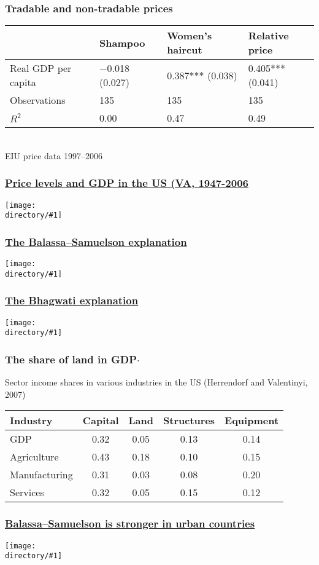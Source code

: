 \documentclass[compress,mathserif]{beamer}
\newcounter{perc}
\newcounter{percek}
\newcommand{\directory}{figures}
\newcommand{\widefigure}[2]{\begin{frame}\frametitle{\hyperlink{#1back}{#2}}\hypertarget{#1}{{\begin{center}\label{#1}\texttt{[image: \\directory/\#1]}\end{center}}}\end{frame}}
\renewcommand{\time}[1]{\addtocounter{percek}{#1}}
\begin{document}

\begin{frame}\frametitle{Tradable and non-tradable prices}
\label{shampoo}
\begin{center}
\begin{tabular}{lm{5em}m{5em}m{5em}}
  \hline
   & Shampoo & Women's haircut & Relative price\\
   \hline
  Real GDP per capita & $-$0.018   (0.027) & 0.387***   (0.038) & 0.405***   (0.041)\\
\hline
  Observations &  135 & 135 & 135
\\
  $R^2$ &  0.00& 0.47 & 0.49
\\
  \hline
\end{tabular}\\
{\small EIU price data 1997--2006}
\end{center}
\end{frame}

\time 2

\widefigure{US_VA_prices}{Price levels and GDP in the US (VA, 1947-2006}

\widefigure{PPF-balassa}{The Balassa--Samuelson explanation}

\widefigure{PPF-bhagwati}{The Bhagwati explanation}

\begin{frame}\frametitle{The share of land in GDP$\cdot$}
Sector income shares in various industries in the US (Herrendorf and Valentinyi, 2007)
\label{Valentinyi}
\begin{center}
\begin{tabular}{l|c|ccc}
\hline\hline
Industry    & Capital   &   Land    & Structures    & Equipment \\ \hline
GDP         &   0.32    &   0.05    & 0.13          & 0.14      \\ \hline
Agriculture & 0.43      &   0.18    & 0.10          & 0.15      \\
Manufacturing & 0.31    &   0.03    & 0.08          & 0.20      \\
Services    & 0.32      & 0.05      & 0.15          & 0.12      \\ \hline\hline
\end{tabular}
\end{center}
\end{frame}
\widefigure{sc_penn}{Balassa--Samuelson is stronger in urban countries}
\end{document}
